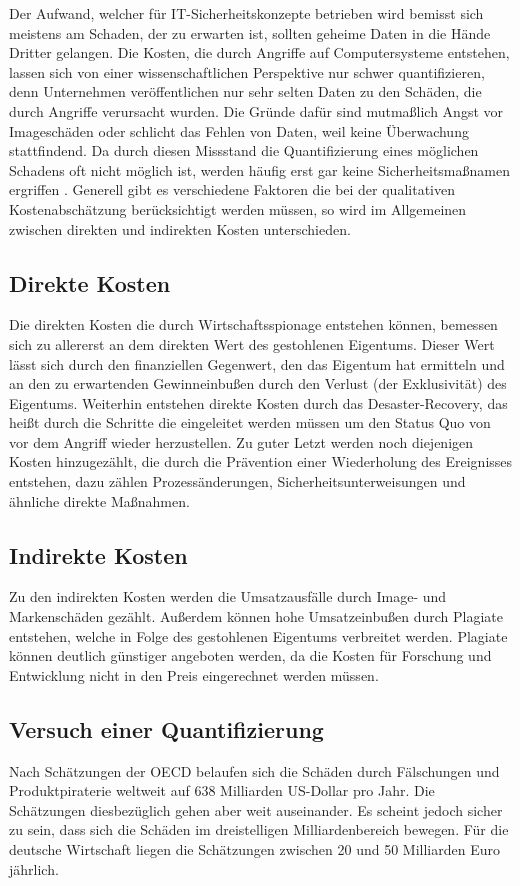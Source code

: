 \documentclass[
book,
a4paper,   
titlepage,  
halfparskip,
12pt        
]{scrartcl}
\begin{document}
\begin{onehalfspacing}
Der Aufwand, welcher für \ac{IT}-Sicherheitskonzepte betrieben wird bemisst sich meistens am Schaden, der zu erwarten ist, sollten geheime Daten in die Hände Dritter gelangen. Die Kosten, die durch Angriffe auf Computersysteme entstehen, lassen sich von einer wissenschaftlichen Perspektive nur schwer quantifizieren, denn Unternehmen veröffentlichen nur sehr selten Daten zu den Schäden, die durch Angriffe verursacht wurden. Die Gründe dafür sind mutmaßlich Angst vor Imageschäden oder schlicht das Fehlen von Daten, weil keine Überwachung stattfindend. Da durch diesen Missstand die Quantifizierung eines möglichen Schadens oft nicht möglich ist, werden häufig erst gar keine Sicherheitsmaßnamen ergriffen \cite{spionage}. Generell gibt es verschiedene Faktoren die bei der qualitativen Kostenabschätzung berücksichtigt werden müssen, so wird im Allgemeinen zwischen direkten und indirekten Kosten unterschieden.\cite[S. 12]{kosten}
\subsection{Direkte Kosten}
Die direkten Kosten die durch Wirtschaftsspionage entstehen können, bemessen sich zu allererst an dem direkten Wert des gestohlenen Eigentums. Dieser Wert lässt sich durch den finanziellen Gegenwert, den das Eigentum hat ermitteln und an den zu erwartenden Gewinneinbußen durch den Verlust (der Exklusivität) des Eigentums. Weiterhin entstehen direkte Kosten durch das Desaster-Recovery, das heißt durch die Schritte die eingeleitet werden müssen um den Status Quo von vor dem Angriff wieder herzustellen. Zu guter Letzt werden noch diejenigen Kosten hinzugezählt, die durch die Prävention einer Wiederholung des Ereignisses entstehen, dazu zählen Prozessänderungen, Sicherheitsunterweisungen und ähnliche direkte Maßnahmen.\cite[S. 13]{kosten}
\subsection{Indirekte Kosten}
Zu den indirekten Kosten werden die Umsatzausfälle durch Image- und Markenschäden gezählt. Außerdem können hohe Umsatzeinbußen durch Plagiate entstehen, welche in Folge des gestohlenen Eigentums verbreitet werden. Plagiate können deutlich günstiger angeboten werden, da die Kosten für Forschung und Entwicklung nicht in den Preis eingerechnet werden müssen.\cite[S. 14]{kosten}
\subsection{Versuch einer Quantifizierung}
Nach Schätzungen der \ac{OECD} belaufen sich die Schäden durch Fälschungen und Produktpiraterie weltweit auf 638 Milliarden US-Dollar pro Jahr. Die Schätzungen diesbezüglich gehen aber weit auseinander. Es scheint jedoch sicher zu sein, dass sich die Schäden im dreistelligen Milliardenbereich bewegen. Für die deutsche Wirtschaft liegen die Schätzungen zwischen 20 und 50 Milliarden Euro jährlich.\cite[S. 16f]{kosten}

\end{onehalfspacing}
\end{document}
